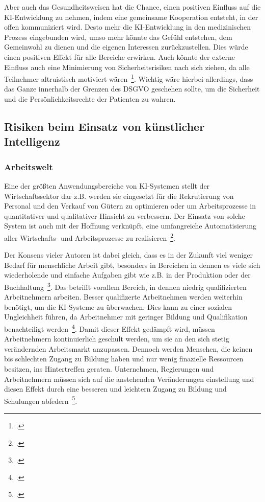 Aber auch das Gesundheitsweisen hat die Chance, einen positiven Einfluss auf die \ac{KI}-Entwicklung zu nehmen, indem eine gemeinsame Kooperation entsteht, in der offen kommuniziert wird.
Desto mehr die \ac{KI}-Entwicklung in den medizinischen Prozess eingebunden wird, umso mehr könnte das Gefühl entstehen, dem Gemeinwohl zu dienen und die eigenen
Interessen zurückzustellen. Dies würde einen positiven Effekt für alle Bereiche erwirken. Auch könnte der externe Einfluss auch eine Minimierung von 
Sicherheitsrisiken nach sich ziehen, da alle Teilnehmer altruistisch motiviert wären~\footcite[\vglf][]{Buchkremer.2020}. 
Wichtig wäre hierbei allerdings, dass das Ganze innerhalb der Grenzen des \ac{DSGVO} geschehen sollte, um die Sicherheit und die Persönlichkeitsrechte der Patienten zu wahren.

\subsection{Risiken beim Einsatz von künstlicher Intelligenz}
\subsubsection{Arbeitswelt}
Eine der größten Anwendungsbereiche von \ac{KI}-Systemen stellt der Wirtschaftssektor dar z.B. werden sie eingesetzt für die Rekrutierung von Personal und den Verkauf von Gütern zu optimieren oder um
Arbeitsprozesse in quantitativer und qualitativer Hinsicht zu verbessern. Der Einsatz von solche System ist auch mit der Hoffnung verknüpft, eine umfangreiche
Automatisierung aller Wirtschafts- und Arbeitsprozesse zu realisieren~\footcite[\vglf][]{Heinrichs.2022}.

Der Konsens vieler Autoren ist dabei gleich, dass es in der Zukunft viel weniger Bedarf für menschliche Arbeit gibt, besonders in Bereichen in dennen es viele
sich wiederholende und einfache Aufgaben gibt wie z.B. in der Produktion oder der Buchhaltung~\footcite[\vglf][]{Robot.2023}.
Das betrifft vorallem Bereich, in dennen niedrig qualifizierten Arbeitnehmern arbeiten. Besser qualifizerte Arbeitnehmen werden weiterhin 
benötigt, um die \ac{KI}-Systeme zu überwachen. Dies kann zu einer sozialen Ungleichheit führen, da Arbeitnehmer mit geringer Bildung 
und Qualifikation benachteiligt werden~\footcite[\vglf][]{Robot.2023}. Damit dieser Effekt gedämpft wird, müssen Arbeitnehmern
kontinuierlich geschult werden, um sie an den sich stetig verändernden Arbeitsmarkt anzupassen.
Dennoch werden Menschen, die keinen bis schlechten Zugang zu Bildung haben und nur wenig finazielle Ressourcen besitzen, ins Hintertreffen geraten. 
Unternehmen, Regierungen und Arbeitnehmern müssen sich auf die anstehenden Veränderungen einstellung und diesen Effekt durch eine besseren und leichtern
Zugang zu Bildung und Schulungen abfedern~\footcite[\vglf][]{Robot.2023}.

